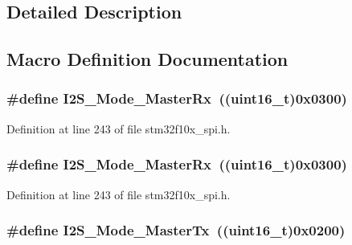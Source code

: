 \subsection{Detailed Description}


\subsection{Macro Definition Documentation}
\subsubsection[{\texorpdfstring{I2\+S\+\_\+\+Mode\+\_\+\+Master\+Rx}{I2S_Mode_MasterRx}}]{\setlength{\rightskip}{0pt plus 5cm}\#define I2\+S\+\_\+\+Mode\+\_\+\+Master\+Rx~(({\bf uint16\+\_\+t})0x0300)}\hypertarget{group___i2_s___mode_gabf9f872cda7c0f159c5fc18aed44e973}{}\label{group___i2_s___mode_gabf9f872cda7c0f159c5fc18aed44e973}


Definition at line 243 of file stm32f10x\+\_\+spi.\+h.

\subsubsection[{\texorpdfstring{I2\+S\+\_\+\+Mode\+\_\+\+Master\+Rx}{I2S_Mode_MasterRx}}]{\setlength{\rightskip}{0pt plus 5cm}\#define I2\+S\+\_\+\+Mode\+\_\+\+Master\+Rx~(({\bf uint16\+\_\+t})0x0300)}\hypertarget{group___i2_s___mode_gabf9f872cda7c0f159c5fc18aed44e973}{}\label{group___i2_s___mode_gabf9f872cda7c0f159c5fc18aed44e973}


Definition at line 243 of file stm32f10x\+\_\+spi.\+h.

\subsubsection[{\texorpdfstring{I2\+S\+\_\+\+Mode\+\_\+\+Master\+Tx}{I2S_Mode_MasterTx}}]{\setlength{\rightskip}{0pt plus 5cm}\#define I2\+S\+\_\+\+Mode\+\_\+\+Master\+Tx~(({\bf uint16\+\_\+t})0x0200)}\hypertarget{group___i2_s___mode_ga3a62ee8964033a3f6fd030da9e40fba6}{}\label{group___i2_s___mode_ga3a62ee8964033a3f6fd030da9e40fba6}


